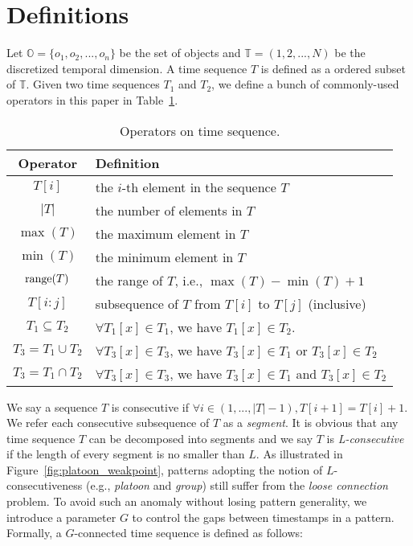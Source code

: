 \section{Definitions}
\label{sec:definition}
Let $\mathbb{O} = \{o_1 ,o_2,...,o_n\}$ be the set of objects and $\mathbb{T} =(1,2,...,N)$ be the discretized temporal dimension. A time sequence $T$ is defined as a ordered subset of $\mathbb{T}$. Given two time sequences $T_1$ and $T_2$, we define a bunch of commonly-used operators in this paper in Table~\ref{tbl:operators}.

\begin{table}[h] \scriptsize
\centering
\begin{tabular}{|c|l|}
\hline 
\textbf{Operator} & \textbf{Definition} \\ 
\hline
$T[i]$ & the $i$-th element in the sequence $T$ \\ 
\hline
$|T|$ & the number of elements in $T$\\
\hline
$\max(T)$ & the maximum element in $T$\\
\hline
$\min(T)$ & the minimum element in $T$\\
\hline
$\operatorname*{range}(T)$ & the range of $T$, i.e., $\max(T) - \min(T) +1$\\ 
\hline 
$T[i:j]$ & subsequence of $T$ from $T[i]$ to $T[j]$ (inclusive) \\ 
\hline
$T_1\subseteq T_2$ &  $\forall T_1[x]\in T_1$, we have $T_1[x]\in T_2$. \\\hline
$T_3=T_1\cup T_2$ & $\forall T_3[x]\in T_3$, we have $T_3[x]\in T_1$ or $T_3[x] \in T_2$\\ 
\hline
$T_3=T_1\cap T_2$ & $\forall T_3[x]\in T_3$, we have $T_3[x]\in T_1$ and $T_3[x] \in T_2$\\ 
\hline
\end{tabular}
\caption{Operators on time sequence.} \label{tbl:operators}
\end{table} 
 

We say a sequence $T$ is consecutive 
if $\forall i \in (1,...,|T|-1), T[i+1] = T[i] + 1$.  We refer each consecutive subsequence of $T$ as a \emph{segment}.
It is obvious that any time sequence $T$ can be decomposed into
segments and we say $T$ is \textit{L-consecutive}~\cite{li2015platoon} 
if the length of every segment is no smaller than $L$. As illustrated in Figure~\ref{fig:platoon_weakpoint}, patterns adopting the notion of $L$-consecutiveness (e.g., \emph{platoon} and \emph{group}) still suffer from the \emph{loose connection} problem. 
To avoid such an anomaly without losing pattern generality, we introduce a parameter $G$ to control the gaps between
timestamps in a pattern. Formally, a $G$-connected time sequence is defined as follows:

